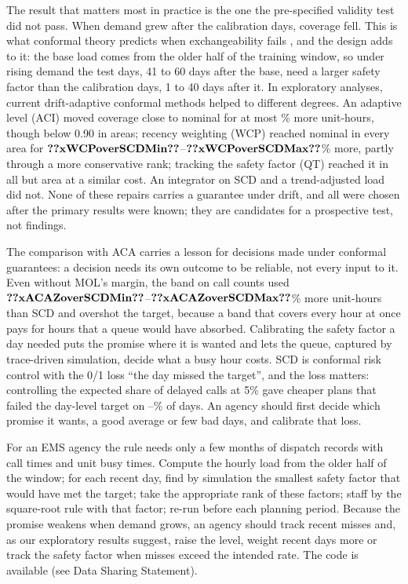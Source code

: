 \documentclass[11pt]{article}
\begin{document}
The result that matters most in practice is the one the pre-specified validity test did not pass. When demand grew after the calibration days, coverage fell. This is what conformal theory predicts when exchangeability fails \citep{barber2023beyond}, and the design adds to it: the base load comes from the older half of the training window, so under rising demand the test days, 41 to 60 days after the base, need a larger safety factor than the calibration days, 1 to 40 days after it. In exploratory analyses, current drift-adaptive conformal methods helped to different degrees. An adaptive level (ACI) moved coverage close to nominal for at most \% more unit-hours, though below 0.90 in  areas; recency weighting (WCP) reached nominal in every area for $\res{xWCPoverSCDMin}$--$\res{xWCPoverSCDMax}$\% more, partly through a more conservative rank; tracking the safety factor (QT) reached it in all but  area at a similar cost. An integrator on SCD and a trend-adjusted load did not. None of these repairs carries a guarantee under drift, and all were chosen after the primary results were known; they are candidates for a prospective test, not findings.

The comparison with ACA carries a lesson for decisions made under conformal guarantees: a decision needs its own outcome to be reliable, not every input to it. Even without MOL's margin, the band on call counts used $\res{xACAZoverSCDMin}$--$\res{xACAZoverSCDMax}$\% more unit-hours than SCD and overshot the target, because a band that covers every hour at once pays for hours that a queue would have absorbed. Calibrating the safety factor a day needed puts the promise where it is wanted and lets the queue, captured by trace-driven simulation, decide what a busy hour costs. SCD is conformal risk control \citep{angelopoulos2024conformal} with the 0/1 loss ``the day missed the target'', and the loss matters: controlling the expected share of delayed calls at 5\% gave cheaper plans that failed the day-level target on --\% of days. An agency should first decide which promise it wants, a good average or few bad days, and calibrate that loss.

For an EMS agency the rule needs only a few months of dispatch records with call times and unit busy times. Compute the hourly load from the older half of the window; for each recent day, find by simulation the smallest safety factor that would have met the target; take the appropriate rank of these factors; staff by the square-root rule with that factor; re-run before each planning period. Because the promise weakens when demand grows, an agency should track recent misses and, as our exploratory results suggest, raise the level, weight recent days more or track the safety factor when misses exceed the intended rate. The code is available (see Data Sharing Statement).
\end{document}
